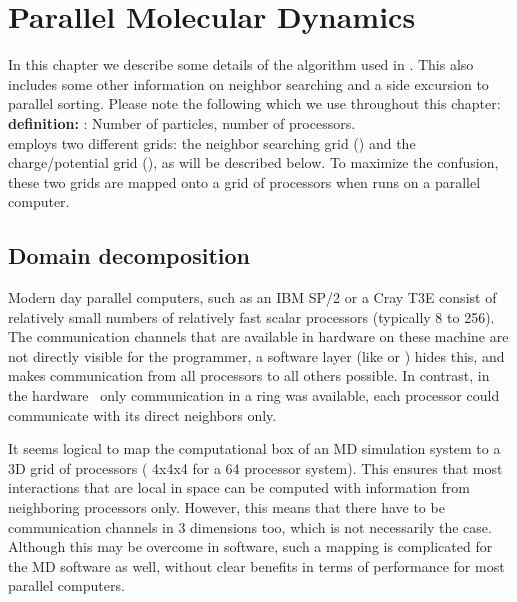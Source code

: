%
% 
% 
% 
% 
% 
% 
% 
% 
%

\section{Parallel Molecular Dynamics}
In this chapter we describe some details of the   
algorithm used 
in {\gromacs}. This also includes some other information on neighbor searching and
a side excursion to parallel sorting.
Please note the following which we use throughout this chapter:\\
{\bf definition:} {\natom}: Number of particles, {\nproc} number of processors.\\
{\gromacs} employs two different grids: the neighbor searching grid ({\nsgrid})
and the charge/potential grid ({\fftgrid}), as will be described below.
To maximize the confusion, 
these two grids are mapped onto a grid of processors when {\gromacs} runs on a 
parallel computer.

\subsection{Domain decomposition}
Modern day parallel computers, such as an IBM SP/2 or a Cray T3E
consist of relatively small numbers of relatively fast scalar
processors (typically 8 to 256).  The communication channels that are
available in hardware on these machine are not directly visible for
the programmer, a software layer (like  or
) hides this, and makes communication from all processors to all
others possible. In contrast, in the {\gromacs} hardware~\cite{Berendsen95a}
only communication in a ring was available, {\ie} each processor could communicate
with its direct neighbors only.

It seems logical to map the computational box of an MD simulation system 
to a 3D grid of 
processors ({\eg} 4x4x4 for a 64 processor system). This ensures that most 
interactions that are local in space can be computed with information from 
neighboring processors only. However, this means that there have to be
communication channels in 3 dimensions too, which is not necessarily the case.
Although this may be overcome in software, such a mapping is complicated for the MD
software as well, without clear benefits in terms of performance for most
parallel computers. 

